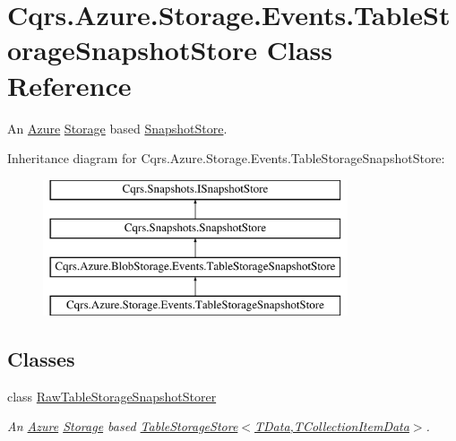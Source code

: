 \hypertarget{classCqrs_1_1Azure_1_1Storage_1_1Events_1_1TableStorageSnapshotStore}{}\section{Cqrs.\+Azure.\+Storage.\+Events.\+Table\+Storage\+Snapshot\+Store Class Reference}
\label{classCqrs_1_1Azure_1_1Storage_1_1Events_1_1TableStorageSnapshotStore}


An \hyperlink{namespaceCqrs_1_1Azure}{Azure} \hyperlink{namespaceCqrs_1_1Azure_1_1Storage}{Storage} based \hyperlink{classCqrs_1_1Snapshots_1_1SnapshotStore_aa8ab186f864443c7d9647a4522864a84_aa8ab186f864443c7d9647a4522864a84}{Snapshot\+Store}.  


Inheritance diagram for Cqrs.\+Azure.\+Storage.\+Events.\+Table\+Storage\+Snapshot\+Store\+:\begin{figure}[H]
\begin{center}
\leavevmode
\includegraphics[height=4.000000cm]{classCqrs_1_1Azure_1_1Storage_1_1Events_1_1TableStorageSnapshotStore}
\end{center}
\end{figure}
\subsection*{Classes}
\begin{DoxyCompactItemize}
\item 
class \hyperlink{classCqrs_1_1Azure_1_1Storage_1_1Events_1_1TableStorageSnapshotStore_1_1RawTableStorageSnapshotStorer}{Raw\+Table\+Storage\+Snapshot\+Storer}
\begin{DoxyCompactList}\small\item\em An \hyperlink{namespaceCqrs_1_1Azure}{Azure} \hyperlink{namespaceCqrs_1_1Azure_1_1Storage}{Storage} based \hyperlink{classCqrs_1_1Azure_1_1BlobStorage_1_1Events_1_1TableStorageSnapshotStore_a9b35cccc8db03b41466526f60767ed5f_a9b35cccc8db03b41466526f60767ed5f}{Table\+Storage\+Store$<$\+T\+Data,\+T\+Collection\+Item\+Data$>$}. \end{DoxyCompactList}\end{DoxyCompactItemize}
